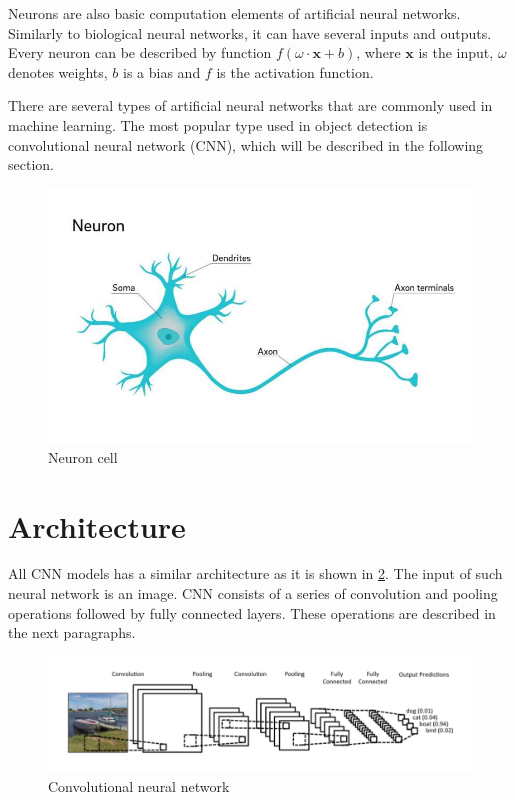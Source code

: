\documentclass[twoside]{ctuthesis}
\theoremstyle{plain}
\theoremstyle{definition}
\theoremstyle{note}
\begin{document}
Neurons are also basic computation elements of artificial neural networks. Similarly to biological neural networks, it can have several inputs and outputs. Every neuron can be described by function $f\left(\omega \cdot \textbf{x}  + b\right)$, where $\textbf{x}$ is the input, $\omega$ denotes weights, $b$ is a bias and $f$ is the activation function. 

There are several types of artificial neural networks that are commonly used in machine learning. The most popular type used in object detection is convolutional neural network (CNN), which will be described in the following section.

\begin{figure}[h]
\caption{Neuron cell\cite{staff_2018}}
\label{neuron}
\includegraphics[width=\textwidth]{images/neural_networks/2-whyareneuron.jpg}
\end{figure}

\section{Architecture}

All CNN models has a similar architecture as it is shown in \ref{conv_full}. The input of such neural network is an image. CNN consists of a series of convolution and pooling operations followed by fully connected layers. These operations are described in the next paragraphs. 



\begin{figure}[h]
\caption{Convolutional neural network\cite{britz_2016}}
\label{conv_full}
\includegraphics[width=\textwidth]{images/neural_networks/conv_full.png}
\end{figure}
\end{document}
